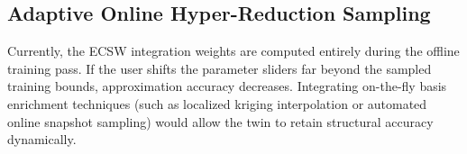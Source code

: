 \subsection{Adaptive Online Hyper-Reduction Sampling}
Currently, the ECSW integration weights are computed entirely during the offline training pass. If the user shifts the parameter sliders far beyond the sampled training bounds, approximation accuracy decreases. Integrating on-the-fly basis enrichment techniques (such as localized kriging interpolation or automated online snapshot sampling) would allow the twin to retain structural accuracy dynamically.


